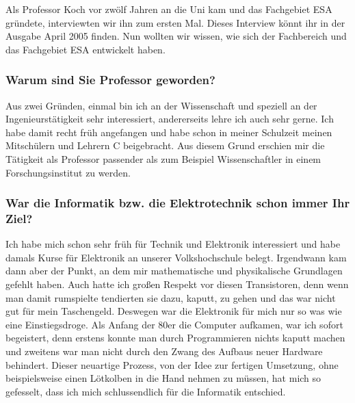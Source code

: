 

{Als Professor Koch vor zwölf Jahren an die Uni kam und das Fachgebiet ESA gründete, interviewten wir ihn zum ersten Mal. Dieses Interview könnt ihr in der Ausgabe April 2005 finden. Nun wollten wir wissen, wie sich der Fachbereich und das Fachgebiet ESA entwickelt haben.
}
{
    \subsubsection*{Warum sind Sie Professor geworden?}
    Aus zwei Gründen, einmal bin ich an der Wissenschaft und speziell an der Ingenieurstätigkeit sehr interessiert, andererseits lehre ich auch sehr gerne. Ich habe damit recht früh angefangen und habe schon in meiner Schulzeit meinen Mitschülern und Lehrern C beigebracht. Aus diesem Grund erschien mir die Tätigkeit als Professor passender als zum Beispiel Wissenschaftler in einem Forschungsinstitut zu werden.

    \subsubsection{War die Informatik bzw. die Elektrotechnik schon immer Ihr Ziel?}
    Ich habe mich schon sehr früh für Technik und Elektronik interessiert und habe damals Kurse für Elektronik an unserer Volkshochschule belegt. Irgendwann kam dann aber der Punkt, an dem mir mathematische und physikalische Grundlagen gefehlt haben. Auch hatte ich großen Respekt vor diesen Transistoren, denn wenn man damit rumspielte tendierten sie dazu, kaputt, zu gehen und das war nicht gut für mein Taschengeld. Deswegen war die Elektronik für mich nur so was wie eine Einstiegsdroge. Als Anfang der 80er die Computer aufkamen, war ich sofort begeistert, denn erstens konnte man durch Programmieren nichts kaputt machen und zweitens war man nicht durch den Zwang des Aufbaus neuer Hardware behindert. Dieser neuartige Prozess, von der Idee zur fertigen Umsetzung, ohne beispielsweise einen Lötkolben in die Hand nehmen zu müssen, hat mich so gefesselt, dass ich mich schlussendlich für die Informatik entschied.

}
